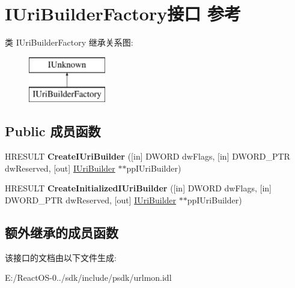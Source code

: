 \hypertarget{interface_i_uri_builder_factory}{}\section{I\+Uri\+Builder\+Factory接口 参考}
\label{interface_i_uri_builder_factory}
类 I\+Uri\+Builder\+Factory 继承关系图\+:\begin{figure}[H]
\begin{center}
\leavevmode
\includegraphics[height=2.000000cm]{interface_i_uri_builder_factory}
\end{center}
\end{figure}
\subsection*{Public 成员函数}
\begin{DoxyCompactItemize}
\item 
\mbox{\label{interface_i_uri_builder_factory_ae2157125978f9a1ce4668fad1e20d931}} 
H\+R\+E\+S\+U\+LT {\bfseries Create\+I\+Uri\+Builder} (\mbox{[}in\mbox{]} D\+W\+O\+RD dw\+Flags, \mbox{[}in\mbox{]} D\+W\+O\+R\+D\+\_\+\+P\+TR dw\+Reserved, \mbox{[}out\mbox{]} \hyperlink{interface_i_uri_builder}{I\+Uri\+Builder} $\ast$$\ast$pp\+I\+Uri\+Builder)
\item 
\mbox{\label{interface_i_uri_builder_factory_a1651c7750d4d2f0c446580191a79b043}} 
H\+R\+E\+S\+U\+LT {\bfseries Create\+Initialized\+I\+Uri\+Builder} (\mbox{[}in\mbox{]} D\+W\+O\+RD dw\+Flags, \mbox{[}in\mbox{]} D\+W\+O\+R\+D\+\_\+\+P\+TR dw\+Reserved, \mbox{[}out\mbox{]} \hyperlink{interface_i_uri_builder}{I\+Uri\+Builder} $\ast$$\ast$pp\+I\+Uri\+Builder)
\end{DoxyCompactItemize}
\subsection*{额外继承的成员函数}


该接口的文档由以下文件生成\+:\begin{DoxyCompactItemize}
\item 
E\+:/\+React\+O\+S-\/0../sdk/include/psdk/urlmon.\+idl\end{DoxyCompactItemize}
